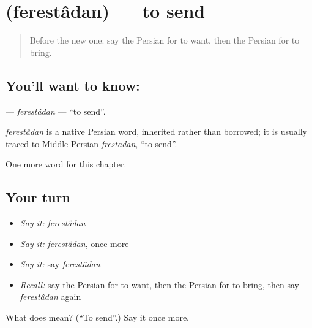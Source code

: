 \section[\texorpdfstring{\fa{فرستادن} (ferestâdan)}{فرستادن (ferestâdan)}]{ (ferestâdan) — to send}

\label{lesson:FA-C38-ferestadan}



\begin{quote}
Before the new one: say the Persian for to want, then the Persian for to bring.
\end{quote}

\subsection*{You'll want to know: }
\textbf{} — \emph{ferestâdan} — \textquotedblleft{}to send\textquotedblright{}.

\begin{cousinweb}
\emph{ferestâdan} is a native Persian word, inherited rather than borrowed; it is usually traced to Middle Persian \emph{frēstādan}, \textquotedblleft{}to send\textquotedblright{}.
\end{cousinweb}

\begin{grammarlens}[title={What you've built}]
One more word for this chapter.
\end{grammarlens}

\subsection*{Your turn}
\begin{itemize}
\raggedright
  \item \emph{Say it:} \emph{ferestâdan}
  \item \emph{Say it:} \emph{ferestâdan}, once more
  \item \emph{Say it:} say \emph{ferestâdan}
  \item \emph{Recall:} say the Persian for to want, then the Persian for to bring, then say \emph{ferestâdan} again
\end{itemize}

\begin{tcolorbox}[breakable,colback=teal!4,colframe=teal!35!black,title={Before you move on}]
What does  mean? (\textquotedblleft{}To send\textquotedblright{}.) Say it once more.
\end{tcolorbox}
